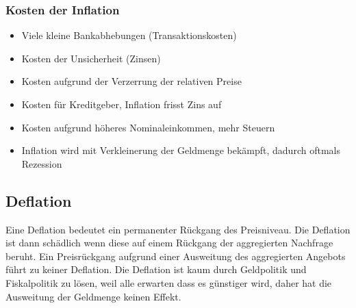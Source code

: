 \subsubsection{Kosten der Inflation}
\begin{itemize}
	\item Viele kleine Bankabhebungen (Transaktionskosten)
	\item Kosten der Unsicherheit (Zinsen)
	\item Kosten aufgrund der Verzerrung der relativen Preise
	\item Kosten für Kreditgeber, Inflation frisst Zins auf
	\item Kosten aufgrund höheres Nominaleinkommen, mehr Steuern
	\item Inflation wird mit Verkleinerung der Geldmenge bekämpft, dadurch oftmals Rezession
\end{itemize}
\subsection{Deflation}
Eine Deflation bedeutet ein permanenter Rückgang des Preisniveau. 
Die Deflation ist dann schädlich wenn diese auf einem Rückgang der aggregierten Nachfrage beruht. Ein Preisrückgang aufgrund einer Ausweitung des aggregierten Angebots führt zu keiner Deflation. Die Deflation ist kaum durch Geldpolitik und Fiskalpolitik zu lösen, weil alle erwarten dass es günstiger wird, daher hat die Ausweitung der Geldmenge keinen Effekt.
\clearpage
\pagebreak